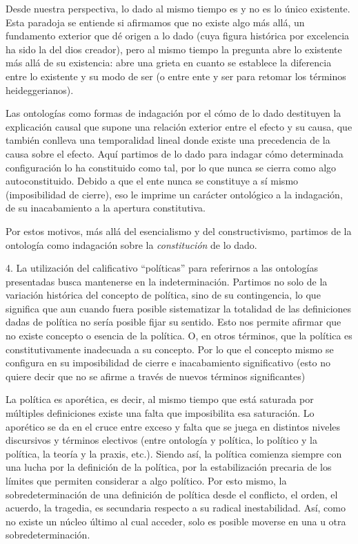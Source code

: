 Desde nuestra perspectiva, lo dado al mismo tiempo es y no es lo único
existente. Esta paradoja se entiende si afirmamos que no existe algo más
allá, un fundamento exterior que dé origen a lo dado (cuya figura
histórica por excelencia ha sido la del dios creador), pero al mismo
tiempo la pregunta abre lo existente más allá de su existencia: abre una
grieta en cuanto se establece la diferencia entre lo existente y su modo
de ser (o entre ente y ser para retomar los términos heideggerianos).

Las ontologías como formas de indagación por el cómo de lo dado
destituyen la explicación causal que supone una relación exterior entre
el efecto y su causa, que también conlleva una temporalidad lineal donde
existe una precedencia de la causa sobre el efecto. Aquí partimos de lo
dado para indagar cómo determinada configuración lo ha constituido como
tal, por lo que nunca se cierra como algo autoconstituido. Debido a que
el ente nunca se constituye a sí mismo (imposibilidad de cierre), eso le
imprime un carácter ontológico a la indagación, de su inacabamiento a la
apertura constitutiva.

Por estos motivos, más allá del esencialismo y del constructivismo,
partimos de la ontología como indagación sobre la \emph{constitución} de
lo dado.

4. La utilización del calificativo \enquote{políticas} para referirnos a las
ontologías presentadas busca mantenerse en la indeterminación. Partimos
no solo de la variación histórica del concepto de política, sino de su
contingencia, lo que significa que aun cuando fuera posible sistematizar
la totalidad de las definiciones dadas de política no sería posible
fijar su sentido. Esto nos permite afirmar que no existe concepto o
esencia de la política. O, en otros términos, que la política es
constitutivamente inadecuada a su concepto. Por lo que el concepto mismo
se configura en su imposibilidad de cierre e inacabamiento significativo
(esto no quiere decir que no se afirme a través de nuevos términos
significantes)

La política es aporética, es decir, al mismo tiempo que está saturada
por múltiples definiciones existe una falta que imposibilita esa
saturación. Lo aporético se da en el cruce entre exceso y falta que se
juega en distintos niveles discursivos y términos electivos (entre
ontología y política, lo político y la política, la teoría y la praxis,
etc.). Siendo así, la política comienza siempre con una lucha por la
definición de la política, por la estabilización precaria de los límites
que permiten considerar a algo político. Por esto mismo, la
sobredeterminación de una definición de política desde el conflicto, el
orden, el acuerdo, la tragedia, es secundaria respecto a su radical
inestabilidad. Así, como no existe un núcleo último al cual acceder,
solo es posible moverse en una u otra sobredeterminación.

